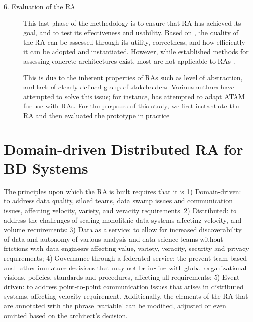 \documentclass[a4paper,11pt]{article}
\let\cite\citep
\begin{document}
\begin{description}
\item[6. Evaluation of the RA] This last phase of the methodology is to ensure that RA has achieved its goal, and to test its effectiveness and usability. Based on \citet{galster2011empirically}, the quality of the RA can be assessed through its utility, correctness, and how efficiently it can be adopted and instantiated. However, while established methods for assessing concrete architectures exist, most are not applicable to RAs \cite{Avgeriou}. 

This is due to the inherent properties of RAs such as level of abstraction, and lack of clearly defined group of stakeholders. Various authors have attempted to solve this issue; for instance, \citet{angelov2008towards} has attempted to adapt ATAM for use with RAs. For the purposes of this study, we first instantiate the RA and then evaluated the prototype in practice

\end{description}


\section{Domain-driven Distributed RA for BD Systems}
\nobreak{}
The principles upon which the RA is built requires that it is 1) Domain-driven: to address data quality, siloed teams, data swamp issues and communication issues, affecting velocity, variety, and veracity requirements; 2) Distributed: to address the challenges of scaling monolithic data systems affecting velocity, and volume requirements; 3) Data as a service: to allow for increased discoverability of data and autonomy of various analysis and data science teams without frictions with data engineers affecting value, variety, veracity, security and privacy requirements; 4) Governance through a federated service: the prevent team-based and rather immature decisions that may not be in-line with global organizational visions, policies, standards and procedures, affecting all requirements; 5) Event driven: to address point-to-point communication issues that arises in distributed systems, affecting velocity requirement. Additionally, the elements of the RA that are annotated with the phrase `variable' can be modified, adjusted or even omitted based on the architect's decision. 
\end{document}
